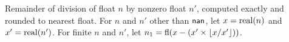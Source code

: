 Remainder of division of float $n$ by nonzero float $n'$, computed exactly and rounded to nearest float. For $n$ and $n'$ other than $\mathsf{nan}$, let $x = \mathrm{real}(n)$ and $x' = \mathrm{real}(n')$. For finite $n$ and $n'$, let $n_1 = \mathrm{fl}(x - (x' \times \lfloor x / x' \rfloor))$.
